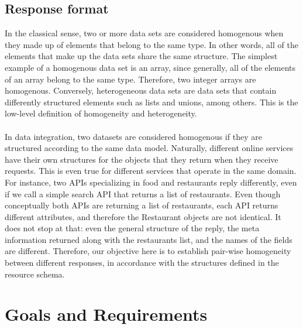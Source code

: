 \subsection{Response format}
In the classical sense, two or more data sets are considered homogenous when they made up of elements that belong to the same type. In other words, all of the elements that make up the data sets share the same structure. The simplest example of a homogenous data set is an array, since generally, all of the elements of an array belong to the same type. Therefore, two integer arrays are homogenous. Conversely, heterogeneous data sets are data sets that contain differently structured elements such as lists and unions, among others. This is the low-level definition of homogeneity and heterogeneity.\\\\
In data integration, two datasets are considered homogenous if they are structured according to the same data model. Naturally, different online services have their own structures for the objects that they return when they receive requests. This is even true for different services that operate in the same domain. For instance, two APIs specializing in food and restaurants reply differently, even if we call a simple search API that returns a list of restaurants. Even though conceptually both APIs are returning a list of restaurants, each API returns different attributes, and therefore the Restaurant objects are not identical. It does not stop at that: even the general structure of the reply, the meta information returned along with the restaurants list, and the names of the fields are different. Therefore, our objective here is to establish pair-wise homogeneity between different responses, in accordance with the structures defined in the resource schema.

\section{Goals and Requirements}

